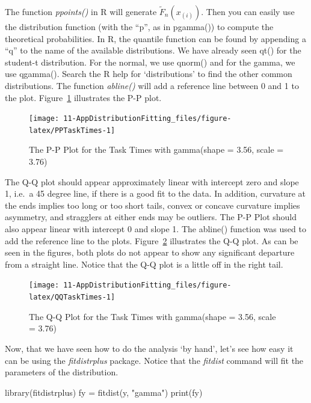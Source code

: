 \documentclass[
]{book}
\newenvironment{Shaded}{\begin{snugshade}}{\end{snugshade}}
\newcommand{\FunctionTok}[1]{\textcolor[rgb]{0.00,0.00,0.00}{#1}}
\newcommand{\NormalTok}[1]{#1}
\newcommand{\OtherTok}[1]{\textcolor[rgb]{0.56,0.35,0.01}{#1}}
\newcommand{\StringTok}[1]{\textcolor[rgb]{0.31,0.60,0.02}{#1}}
\theoremstyle{definition}
\theoremstyle{definition}
\theoremstyle{definition}
\theoremstyle{definition}
\theoremstyle{remark}
\begin{document}
The function \emph{ppoints()} in R will generate \(\tilde{F}_n(x_{(i)})\). Then
you can easily use the distribution function (with the ``p'', as in
pgamma()) to compute the theoretical probabilities. In R, the quantile
function can be found by appending a ``q'' to the name of the available
distributions. We have already seen qt() for the student-t distribution.
For the normal, we use qnorm() and for the gamma, we use qgamma().
Search the R help for `distributions' to find the other common
distributions. The function \emph{abline()} will add a reference line between
0 and 1 to the plot. Figure~\ref{fig:PPTaskTimes} illustrates the P-P plot.

\begin{figure}

{\centering \texttt{[image: 11-AppDistributionFitting\_files/figure-latex/PPTaskTimes-1]} 

}

\caption{The P-P Plot for the Task Times with gamma(shape = 3.56, scale = 3.76)}\label{fig:PPTaskTimes}
\end{figure}

The Q-Q plot should appear approximately linear with intercept zero and
slope 1, i.e.~a 45 degree line, if there is a good fit to the data. In
addition, curvature at the ends implies too long or too short tails,
convex or concave curvature implies asymmetry, and stragglers at either
ends may be outliers. The P-P Plot should also appear linear with
intercept 0 and slope 1. The abline() function was used to add the
reference line to the plots. Figure~\ref{fig:QQTaskTimes} illustrates the Q-Q plot. As can be seen
in the figures, both plots do not appear to show any significant
departure from a straight line. Notice that the Q-Q plot is a little off
in the right tail.

\begin{figure}

{\centering \texttt{[image: 11-AppDistributionFitting\_files/figure-latex/QQTaskTimes-1]} 

}

\caption{The Q-Q Plot for the Task Times with gamma(shape = 3.56, scale = 3.76)}\label{fig:QQTaskTimes}
\end{figure}

Now, that we have seen how to do the analysis `by hand', let's see how
easy it can be using the \emph{fitdistrplus} package. Notice that the
\emph{fitdist} command will fit the parameters of the distribution.

\begin{Shaded}
\begin{Highlighting}[]
\FunctionTok{library}\NormalTok{(fitdistrplus)}
\NormalTok{fy }\OtherTok{=} \FunctionTok{fitdist}\NormalTok{(y, }\StringTok{"gamma"}\NormalTok{)}
\FunctionTok{print}\NormalTok{(fy)}
\end{Highlighting}
\end{Shaded}
\end{document}

